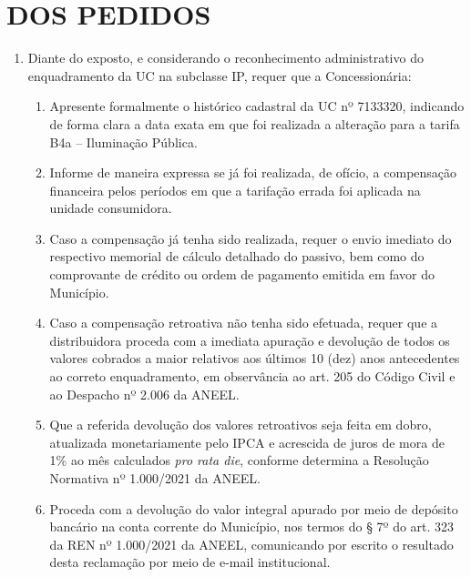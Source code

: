\section{DOS PEDIDOS}

\begin{enumerate}
    \item Diante do exposto, e considerando o reconhecimento administrativo do enquadramento da UC na subclasse IP, requer que a Concessionária:
    
    \begin{enumerate}
        \item Apresente formalmente o histórico cadastral da UC nº 7133320, indicando de forma clara a data exata em que foi realizada a alteração para a tarifa B4a -- Iluminação Pública.
        
        \item Informe de maneira expressa se já foi realizada, de ofício, a compensação financeira pelos períodos em que a tarifação errada foi aplicada na unidade consumidora.
        
        \item Caso a compensação já tenha sido realizada, requer o envio imediato do respectivo memorial de cálculo detalhado do passivo, bem como do comprovante de crédito ou ordem de pagamento emitida em favor do Município.
        
        \item Caso a compensação retroativa não tenha sido efetuada, requer que a distribuidora proceda com a imediata apuração e devolução de todos os valores cobrados a maior relativos aos últimos 10 (dez) anos antecedentes ao correto enquadramento, em observância ao art. 205 do Código Civil e ao Despacho nº 2.006 da ANEEL.
        
        \item Que a referida devolução dos valores retroativos seja feita em dobro, atualizada monetariamente pelo IPCA e acrescida de juros de mora de 1\% ao mês calculados \textit{pro rata die}, conforme determina a Resolução Normativa nº 1.000/2021 da ANEEL.
        
        \item Proceda com a devolução do valor integral apurado por meio de depósito bancário na conta corrente do Município, nos termos do § 7º do art. 323 da REN nº 1.000/2021 da ANEEL, comunicando por escrito o resultado desta reclamação por meio de e-mail institucional.
    \end{enumerate}
\end{enumerate}